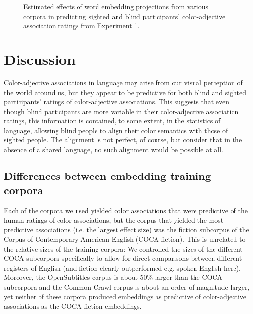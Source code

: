 \documentclass[10pt,letterpaper]{article}
\begin{document}
\begin{figure}[ht!]
\begin{center}
\caption{Estimated effects of word embedding projections from various corpora in predicting sighted and blind participants' color-adjective association ratings from Experiment 1.}
\label{original}
\end{center}
\end{figure}

\section{Discussion}
Color-adjective associations in language may arise from our visual perception of the world around us, but they appear to be predictive for both blind and sighted participants' ratings of color-adjective associations. This suggests that even though blind participants are more variable in their color-adjective association ratings, this information is contained, to some extent, in the statistics of language, allowing blind people to align their color semantics with those of sighted people. The alignment is not perfect, of course, but consider that in the absence of a shared language, no such alignment would be possible at all.

\subsection{Differences between embedding training corpora}
Each of the corpora we used yielded color associations that were predictive of the human ratings of color associations, but the corpus that yielded the most predictive associations (i.e. the largest effect size) was the fiction subcorpus of the Corpus of Contemporary American English (COCA-fiction). This is unrelated to the relative sizes of the training corpora: We controlled the sizes of the different COCA-subcorpora specifically to allow for direct comparisons between different registers of English (and fiction clearly outperformed e.g. spoken English here). Moreover, the OpenSubtitles corpus is about 50\% larger than the COCA-subcorpora and the Common Crawl corpus is about an order of magnitude larger, yet neither of these corpora produced embeddings as predictive of color-adjective associations as the COCA-fiction embeddings.
\end{document}
